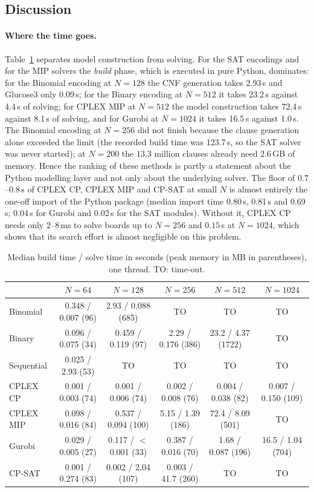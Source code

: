 \documentclass[a4paper,fleqn]{cas-sc}
\begin{document}
\subsection{Discussion}
\paragraph{Where the time goes.}
Table~\ref{tab:split} separates model construction from solving.
For the SAT encodings and for the MIP solvers the \emph{build} phase, which is executed in pure Python, dominates: for the Binomial encoding at $N=128$ the CNF generation takes 2.93\,s and Glucose3 only 0.09\,s; for the Binary encoding at $N=512$ it takes 23.2\,s against 4.4\,s of solving; for CPLEX MIP at $N=512$ the model construction takes 72.4\,s against 8.1\,s of solving, and for Gurobi at $N=1024$ it takes 16.5\,s against 1.0\,s.
The Binomial encoding at $N=256$ did not finish because the clause generation alone exceeded the limit (the recorded build time was 123.7\,s, so the SAT solver was never started); at $N=200$ the $13.3$ million clauses already need $2.6$\,GB of memory.
Hence the ranking of these methods is partly a statement about the Python modelling layer and not only about the underlying solver.
The floor of $0.7$--$0.8$\,s of CPLEX CP, CPLEX MIP and CP-SAT at small $N$ is almost entirely the one-off import of the Python package (median import time 0.80\,s, 0.81\,s and 0.69\,s; 0.04\,s for Gurobi and 0.02\,s for the SAT modules).
Without it, CPLEX CP needs only $2$--$8$\,ms to solve boards up to $N=256$ and $0.15$\,s at $N=1024$, which shows that its search effort is almost negligible on this problem.

\begin{table}[htbp]
\centering
\caption{Median build time / solve time in seconds (peak memory in MB in parentheses), one thread. \textsc{TO}: time-out.}\label{tab:split}
\footnotesize
\setlength{\tabcolsep}{2.4pt}
\begin{tabular}{l ccccc}
\toprule
 & $N=64$ & $N=128$ & $N=256$ & $N=512$ & $N=1024$\\
\midrule
Binomial & 0.348 / 0.007 (96) & 2.93 / 0.088 (685) & TO & TO & TO\\
Binary & 0.096 / 0.075 (34) & 0.459 / 0.119 (97) & 2.29 / 0.176 (386) & 23.2 / 4.37 (1722) & TO\\
Sequential & 0.025 / 2.93 (53) & TO & TO & TO & TO\\
CPLEX CP & 0.001 / 0.003 (74) & 0.001 / 0.006 (74) & 0.002 / 0.008 (76) & 0.004 / 0.038 (82) & 0.007 / 0.150 (109)\\
CPLEX MIP & 0.098 / 0.016 (84) & 0.537 / 0.094 (100) & 5.15 / 1.39 (186) & 72.4 / 8.09 (501) & TO\\
Gurobi & 0.029 / 0.005 (27) & 0.117 / $<$0.001 (33) & 0.387 / 0.016 (70) & 1.68 / 0.087 (196) & 16.5 / 1.04 (704)\\
CP-SAT & 0.001 / 0.274 (83) & 0.002 / 2.04 (107) & 0.003 / 41.7 (260) & TO & TO\\
\bottomrule
\end{tabular}
\end{table}
\end{document}
